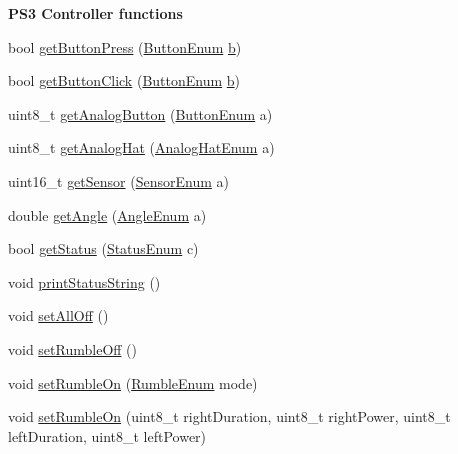 \begin{Indent}{\bf \-P\-S3 \-Controller functions}\par
\begin{DoxyCompactItemize}
\item 
bool \hyperlink{class_p_s3_u_s_b_a89df07d76648a48c1f0ef8fd9604c201}{get\-Button\-Press} (\hyperlink{controller_enums_8h_a94f7389d205c78830a5441370d7870fd}{\-Button\-Enum} \hyperlink{_p_s4_parser_8h_a4313c9563516f94387762ab05763456b}{b})
\item 
bool \hyperlink{class_p_s3_u_s_b_ac22875ff006c68daad6f688551f5e6d5}{get\-Button\-Click} (\hyperlink{controller_enums_8h_a94f7389d205c78830a5441370d7870fd}{\-Button\-Enum} \hyperlink{_p_s4_parser_8h_a4313c9563516f94387762ab05763456b}{b})
\item 
uint8\-\_\-t \hyperlink{class_p_s3_u_s_b_a6844111657a882b1997ca30d2649bd1c}{get\-Analog\-Button} (\hyperlink{controller_enums_8h_a94f7389d205c78830a5441370d7870fd}{\-Button\-Enum} a)
\item 
uint8\-\_\-t \hyperlink{class_p_s3_u_s_b_a0de554815afcb66f57d8ac0045f19f2c}{get\-Analog\-Hat} (\hyperlink{controller_enums_8h_a34dad8f0a0927471137c403216597093}{\-Analog\-Hat\-Enum} a)
\item 
uint16\-\_\-t \hyperlink{class_p_s3_u_s_b_aa01170072ec7fd0e557959ea1d79011e}{get\-Sensor} (\hyperlink{controller_enums_8h_a00d5030559c481763282483889597d51}{\-Sensor\-Enum} a)
\item 
double \hyperlink{class_p_s3_u_s_b_ae5c5316b4c8dae5927b2a2721a28f6c0}{get\-Angle} (\hyperlink{controller_enums_8h_a7c7824a10a9ffa8fea85602fcf4d84e6}{\-Angle\-Enum} a)
\item 
bool \hyperlink{class_p_s3_u_s_b_ad0887b415c3ba180789781a713d98be8}{get\-Status} (\hyperlink{_p_s3_enums_8h_add5c7a32e8138b44244caf07232161ae}{\-Status\-Enum} c)
\item 
void \hyperlink{class_p_s3_u_s_b_a1328a3f017f8d010cd0559c084981021}{print\-Status\-String} ()
\item 
void \hyperlink{class_p_s3_u_s_b_ac7adc7365bb45d15c37e22f26f012498}{set\-All\-Off} ()
\item 
void \hyperlink{class_p_s3_u_s_b_aaa1e66d7397be6364d4f76749cbaad5a}{set\-Rumble\-Off} ()
\item 
void \hyperlink{class_p_s3_u_s_b_a77f44b6007cc735c47bdeaf672c7e464}{set\-Rumble\-On} (\hyperlink{controller_enums_8h_ab195293384292950ebc2166bfe360fd1}{\-Rumble\-Enum} mode)
\item 
void \hyperlink{class_p_s3_u_s_b_a0c2015b53aa60081aa28299800509f80}{set\-Rumble\-On} (uint8\-\_\-t right\-Duration, uint8\-\_\-t right\-Power, uint8\-\_\-t left\-Duration, uint8\-\_\-t left\-Power)

\end{DoxyCompactItemize}
\end{Indent}
